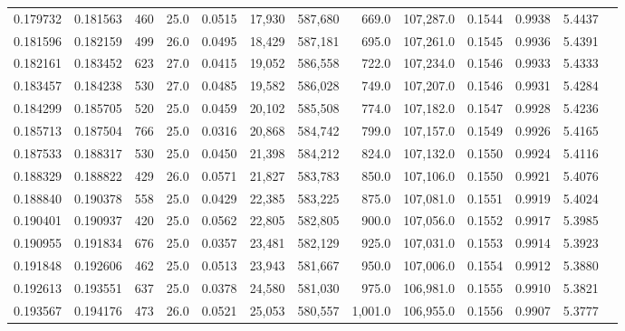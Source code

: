 \begin{tabular}{rrrrrrrrrrrrr}
0.179732 & 0.181563 &   460 & 25.0 &                                     0.0515 &  17,930 & 587,680 &     669.0 & 107,287.0 & 0.1544 & 0.9938 & 5.4437 \\
0.181596 & 0.182159 &   499 & 26.0 &                                     0.0495 &  18,429 & 587,181 &     695.0 & 107,261.0 & 0.1545 & 0.9936 & 5.4391 \\
0.182161 & 0.183452 &   623 & 27.0 &                                     0.0415 &  19,052 & 586,558 &     722.0 & 107,234.0 & 0.1546 & 0.9933 & 5.4333 \\
0.183457 & 0.184238 &   530 & 27.0 &                                     0.0485 &  19,582 & 586,028 &     749.0 & 107,207.0 & 0.1546 & 0.9931 & 5.4284 \\
0.184299 & 0.185705 &   520 & 25.0 &                                     0.0459 &  20,102 & 585,508 &     774.0 & 107,182.0 & 0.1547 & 0.9928 & 5.4236 \\
0.185713 & 0.187504 &   766 & 25.0 &                                     0.0316 &  20,868 & 584,742 &     799.0 & 107,157.0 & 0.1549 & 0.9926 & 5.4165 \\
0.187533 & 0.188317 &   530 & 25.0 &                                     0.0450 &  21,398 & 584,212 &     824.0 & 107,132.0 & 0.1550 & 0.9924 & 5.4116 \\
0.188329 & 0.188822 &   429 & 26.0 &                                     0.0571 &  21,827 & 583,783 &     850.0 & 107,106.0 & 0.1550 & 0.9921 & 5.4076 \\
0.188840 & 0.190378 &   558 & 25.0 &                                     0.0429 &  22,385 & 583,225 &     875.0 & 107,081.0 & 0.1551 & 0.9919 & 5.4024 \\
0.190401 & 0.190937 &   420 & 25.0 &                                     0.0562 &  22,805 & 582,805 &     900.0 & 107,056.0 & 0.1552 & 0.9917 & 5.3985 \\
0.190955 & 0.191834 &   676 & 25.0 &                                     0.0357 &  23,481 & 582,129 &     925.0 & 107,031.0 & 0.1553 & 0.9914 & 5.3923 \\
0.191848 & 0.192606 &   462 & 25.0 &                                     0.0513 &  23,943 & 581,667 &     950.0 & 107,006.0 & 0.1554 & 0.9912 & 5.3880 \\
0.192613 & 0.193551 &   637 & 25.0 &                                     0.0378 &  24,580 & 581,030 &     975.0 & 106,981.0 & 0.1555 & 0.9910 & 5.3821 \\
0.193567 & 0.194176 &   473 & 26.0 &                                     0.0521 &  25,053 & 580,557 &   1,001.0 & 106,955.0 & 0.1556 & 0.9907 & 5.3777 \\

\end{tabular}
